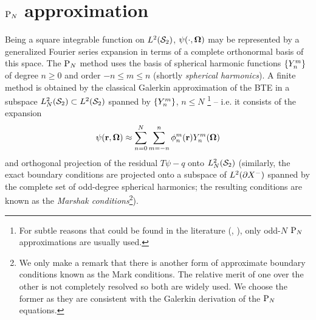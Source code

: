 \section{$\PN$ approximation}\label{sec:SPH}
Being a square integrable function on $\Lp[2](\Sphere)$, $\psi(\cdot,\bomega)$ may be represented by a generalized
Fourier series expansion in terms of a complete orthonormal basis of this space. The $\PN$ method uses the basis of
spherical harmonic functions $\{\Y{n}{m}\}$ of degree $n\geq 0$ and order $-n \leq m \leq n$ (shortly
\textit{spherical harmonics}). A finite method is obtained by the classical Galerkin approximation of the BTE in a
subspace $\Lp[2]_N(\Sphere)\subset\Lp[2](\Sphere)$ spanned by $\{\Y{n}{m}\}$,  $n \leq N$ \footnote{For subtle reasons
that could be found in the literature (\cite[Sec. 10.3.2]{Davison}, \cite[Sec. 9.6]{Stacey1}), only odd-$N$ $\PN$
approximations are usually used.} -- i.e. it consists of the expansion
\begin{equation}\label{eq:exp}
  \psi(\br,\bomega) \approx \suma[n]{0}{N}\suma[m]{-n}{n}\angmom{n}{m}(\br)\Y{n}{m}(\bomega)
\end{equation}
and orthogonal projection of the residual $T\psi - q$ onto $\Lp[2]_N(\Sphere)$ (similarly, the exact boundary conditions 
are projected onto a subspace of $\Lp[2](\pX[-])$ spanned by the complete set of odd-degree spherical harmonics; 
the resulting conditions are known as the \textit{Marshak conditions}\footnote{We only make a remark that there is 
another form of approximate boundary conditions known as the Mark conditions. The relative merit of one over the other 
is not completely resolved so both are widely used. We choose the former as they are consistent with the Galerkin 
derivation of the $\PN$ equations.}).

